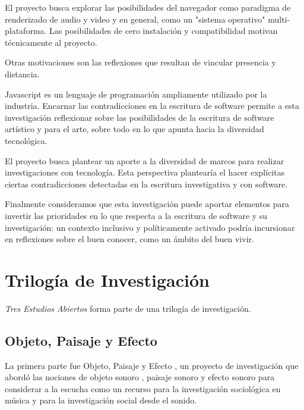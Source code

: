 El proyecto busca explorar las posibilidades del navegador como paradigma de renderizado de audio y video y en general, como un "sistema operativo" multi-plataforma. Las posibilidades de cero instalación y compatibilidad motivan técnicamente al proyecto.

Otras motivaciones son las reflexiones que resultan de vincular presencia y distancia.


Javascript es un lenguaje de programación ampliamente utilizado por la industria. Encarnar las contradicciones en la escritura de software permite a esta investigación reflexionar sobre las posibilidades de la escritura de software artístico y para el arte, sobre todo en lo que apunta hacia la diversidad tecnológica.

El proyecto busca plantear un aporte a la diversidad de marcos para realizar investigaciones con tecnología. Esta perspectiva plantearía el hacer explícitas ciertas contradicciones detectadas en la escritura investigativa y con software. 

Finalmente consideramos que esta investigación puede aportar elementos para invertir las prioridades en lo que respecta a la escritura de software y su investigación: un contexto inclusivo y políticamente activado podría incursionar en reflexiones sobre el buen conocer, como un ámbito del buen vivir. 



\section{Trilogía de Investigación}

\textit{Tres Estudios Abiertos} forma parte de una trilogía de investigación. 

\subsection{Objeto, Paisaje y Efecto}

La primera parte fue Objeto, Paisaje y Efecto \citep{ocelotlLic}, un proyecto de investigación que abordó las nociones de objeto sonoro \citep{schaeffer}, paisaje sonoro\citep{schafer1} y efecto sonoro \citep{augoyard} para considerar a la escucha como un recurso para la investigación sociológica en música y para la investigación social desde el sonido.

